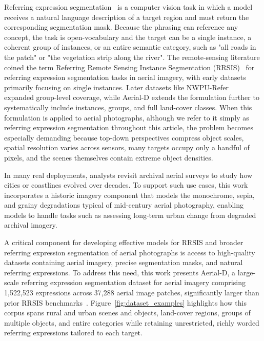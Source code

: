 \documentclass[journal]{IEEEtran}
\begin{document}
Referring expression segmentation~\cite{kazemzadeh2014referit,hu2016segmentation,yu2016modeling} is a computer vision task in which a model receives a natural language description of a target region and must return the corresponding segmentation mask. Because the phrasing can reference any concept, the task is open-vocabulary and the target can be a single instance, a coherent group of instances, or an entire semantic category, such as "all roads in the patch" or "the vegetation strip along the river". The remote-sensing literature coined the term Referring Remote Sensing Instance Segmentation (RRSIS)~\cite{yuan2023rrsis} for referring expression segmentation tasks in aerial imagery, with early datasets primarily focusing on single instances. Later datasets like NWPU-Refer~\cite{yang2024large} expanded group-level coverage, while Aerial-D extends the formulation further to systematically include instances, groups, and full land-cover classes. When this formulation is applied to aerial photographs, although we refer to it simply as referring expression segmentation throughout this article, the problem becomes especially demanding because top-down perspectives compress object scales, spatial resolution varies across sensors, many targets occupy only a handful of pixels, and the scenes themselves contain extreme object densities.

In many real deployments, analysts revisit archival aerial surveys to study how cities or coastlines evolved over decades. To support such use cases, this work incorporates a historic imagery component that models the monochrome, sepia, and grainy degradations typical of mid-century aerial photography, enabling models to handle tasks such as assessing long-term urban change from degraded archival imagery.

A critical component for developing effective models for RRSIS and broader referring expression segmentation of aerial photographs is access to high-quality datasets containing aerial imagery, precise segmentation masks, and natural referring expressions. To address this need, this work presents Aerial-D, a large-scale referring expression segmentation dataset for aerial imagery comprising 1,522,523 expressions across 37,288 aerial image patches, significantly larger than prior RRSIS benchmarks~\cite{yuan2023rrsis,liu2024rotated,yang2024large}. Figure~\ref{fig:dataset_examples} highlights how this corpus spans rural and urban scenes and objects, land-cover regions, groups of multiple objects, and entire categories while retaining unrestricted, richly worded referring expressions tailored to each target.
\end{document}
